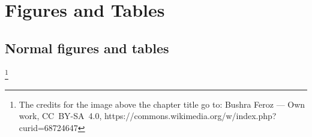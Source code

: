 \setchapterpreamble[u]{\margintoc[*-4.5]}

\makeatletter
\renewcommand{\chapterlinesformat}[3]{%
  \@hangfrom{#2}{#3}%
}
\makeatother
\renewcommand*{\chapterformat}{%
  \mbox{\chapappifchapterprefix{\nobreakspace}\thechapter
	\autodot\IfUsePrefixLine{}{\enskip}}}

\chapter{Figures and Tables}

\section{Normal figures and tables}

\footnote[0]{The credits for the image above the chapter title go to:
	Bushra Feroz --- Own work, CC~BY-SA~4.0, 
	https://commons.wikimedia.org/w/index.php?curid=68724647}

